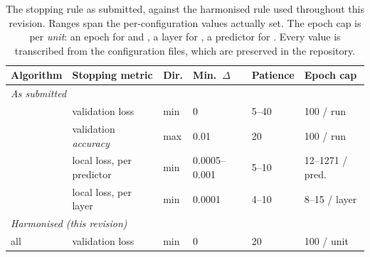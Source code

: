 \begin{table}[tb]
  \centering
  \caption{The stopping rule as submitted, against the harmonised rule used
    throughout this revision. Ranges span the per-configuration values actually
    set. The epoch cap is per \emph{unit}: an epoch for \BP{} and \FF{}, a
    layer for \MF{}, a predictor for \CaFo{}. Every value is transcribed from
    the configuration files, which are preserved in the repository.}
  \label{tab:early_stopping}
  \setlength{\tabcolsep}{3.5pt}%
  \footnotesize
  \begin{tabular}{llllll}
    \toprule
    Algorithm & Stopping metric & Dir. & Min.\ $\Delta$ & Patience & Epoch cap \\
    \midrule
    \multicolumn{6}{l}{\emph{As submitted}} \\
    \BP{}   & validation loss            & min & 0      & 5--40  & 100 / run \\
    \FF{}   & validation \emph{accuracy} & max & 0.01   & 20     & 100 / run \\
    \CaFo{} & local loss, per predictor  & min & 0.0005--0.001 & 5--10 & 12--1271 / pred. \\
    \MF{}   & local loss, per layer      & min & 0.0001 & 4--10  & 8--15 / layer \\
    \midrule
    \multicolumn{6}{l}{\emph{Harmonised (this revision)}} \\
    all     & validation loss            & min & 0      & 20     & 100 / unit \\
    \bottomrule
  \end{tabular}
\end{table}
